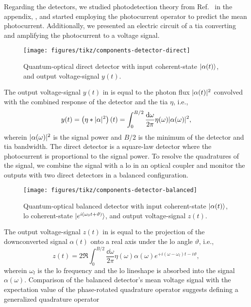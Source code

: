Regarding the detectors, we studied photodetection theory from Ref.~\cite{Mandel1995,Kimble1984,Vogel2006} in the appendix, , and started employing the photocurrent operator to predict the mean photocurrent.
Additionally, we presented an electric circuit of a \gls{tia} converting and amplifying the photocurrent to a voltage signal.
\begin{figure}[htb]
    \centering
    \texttt{[image: figures/tikz/components-detector-direct]}
    \caption{Quantum-optical direct detector with input coherent-state $\lvert\alpha(t)\rangle$, and output voltage-signal $y(t)$.}\label{fig:components_detector_direct}
\end{figure}
The output voltage-signal $y(t)$ in  is equal to the photon flux $\lvert\alpha(t)\rvert^2$ convolved with the combined response of the detector and the \gls{tia} $\eta$, i.e.,
\begin{equation}
	y(t)
	=
	\left(\eta\conv\abs{\alpha}^2\right)(t)
	=
	\int_0^{B/2}\frac{\dd{\omega}}{2\pi}
	\eta(\omega)
	\abs{\alpha(\omega)}^2
	,
\end{equation}
wherein $\lvert\alpha(\omega)\rvert^2$ is the signal power and $B/2$ is the minimum of the detector and \gls{tia} bandwidth.
The direct detector is a square-law detector where the photocurrent is proportional to the signal power.
To resolve the quadratures of the signal, we combine the signal with a \gls{lo} in an optical coupler and monitor the outputs with two direct detectors in a balanced configuration.
\begin{figure}[htb]
    \centering
    \texttt{[image: figures/tikz/components-detector-balanced]}
    \caption{Quantum-optical balanced detector with input coherent-state $\lvert\alpha(t)\rangle$, \gls{lo} coherent-state $\lvert e^{i(\omega_0t+\vartheta)}\rangle$, and output voltage-signal $z(t)$.}\label{fig:components_detector_balanced}
\end{figure}
The output voltage-signal $z(t)$ in  is equal to the projection of the downconverted signal $\alpha(t)$ onto a real axis under the \gls{lo} angle $\vartheta$, i.e.,
\begin{equation}
	z(t)
	=
	2\Re
	\int_0^{B/2}\frac{\dd{\omega}}{2\pi}
	\eta(\omega)
	\alpha(\omega)
	e^{+i(\omega-\omega_l)t-i\vartheta}
	,
\end{equation}
wherein $\omega_l$ is the \gls{lo} frequency and the \gls{lo} lineshape is absorbed into the signal $\alpha(\omega)$.
Comparison of the balanced detector's mean voltage signal with the expectation value of the phase-rotated quadrature operator suggests defining a generalized quadrature operator
